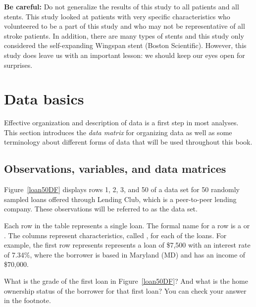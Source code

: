 \textbf{Be careful:}
Do not generalize the results of this study to all patients
and all stents.
This study looked at patients with very specific characteristics
who volunteered to be a part of this study and who may not be
representative of all stroke patients.
In addition, there are many types of stents and this study only
considered the self-expanding Wingspan stent (Boston Scientific).
However, this study does leave us with an important lesson:
we should keep our eyes open for surprises.




\section{Data basics}
\label{dataBasics}

Effective organization and description of data is a first
step in most analyses.
This section introduces the \emph{data matrix} for organizing
data as well as some terminology about different forms of data
that will be used throughout this book.

\subsection{Observations, variables, and data matrices}


Figure~\ref{loan50DF} displays rows 1, 2, 3, and 50 of a data set
for 50 randomly sampled loans offered through Lending Club,
which is a peer-to-peer lending company.
These observations will be referred to as the
 data set.

Each row in the table represents a single loan.
The formal name for a row is a 
or .
The columns represent characteristics,
called ,
for each of the loans.
For example, the first row represents represents a loan of \$7,500 with an interest rate of 7.34\%, where the borrower is based in Maryland (MD) and has an income of \$70,000.

\begin{exercisewrap}
\begin{nexercise}
What is the grade of the first loan in Figure~\ref{loan50DF}?
And what is the home ownership status of the borrower
for that first loan?
You can check your answer in the
footnote.\footnotemark
\end{nexercise}
\end{exercisewrap}

